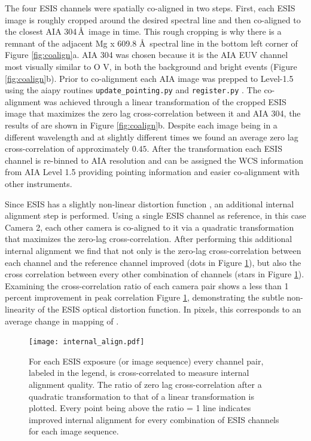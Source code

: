    		The four ESIS channels were spatially co-aligned in two steps.  
   		First, each ESIS image is roughly cropped around the desired spectral line and then co-aligned to the closest AIA 304\,\AA\ image in time.
   		This rough cropping is why there is a remnant of the adjacent Mg {\sc x} 609.8 \AA \ spectral line in the bottom left corner of Figure \ref{fig:coalign}a.
   		AIA 304 was chosen because it is the AIA EUV channel most visually similar to O V, in both the background and bright events (Figure \ref{fig:coalign}b).
   		Prior to co-alignment each AIA image was prepped to Level-1.5 using the aiapy routines \texttt{update\_pointing.py} and \texttt{register.py} \citep{aiapy}.
   		The co-alignment was achieved through a linear transformation of the cropped ESIS image that maximizes the zero lag cross-correlation between it and AIA 304, the results of are shown in Figure \ref{fig:coalign}b.
   		Despite each image being in a different wavelength and at slightly different times we found an average zero lag cross-correlation of approximately $0.45$.
   		After the transformation each ESIS channel is re-binned to AIA resolution and can be assigned the WCS information from AIA Level 1.5 providing pointing information and easier co-alignment with other instruments.

    	Since ESIS has a slightly non-linear distortion function \citep{ESIS}, an additional internal alignment step is performed.
    	Using a single ESIS channel as reference, in this case Camera 2, each other camera is co-aligned to it via a quadratic transformation that maximizes the zero-lag cross-correlation. 
    	After performing this additional internal alignment we find that not only is the zero-lag cross-correlation between each channel and the reference channel improved (dots in Figure \ref{fig:cc}), but also the cross correlation between every other combination of channels (stars in Figure \ref{fig:cc}).
    	Examining the cross-correlation ratio of each camera pair shows a less than 1 percent improvement in peak correlation Figure \ref{fig:cc}, demonstrating the subtle non-linearity of the ESIS optical distortion function.
    	In pixels, this corresponds to an average change in mapping of .
    	
    	\begin{figure}[htb!]
    		\centering
    		\texttt{[image: internal\_align.pdf]}
    		\caption{For each ESIS exposure (or image sequence) every channel pair, labeled in the legend, is cross-correlated to measure internal alignment quality.  The ratio of zero lag cross-correlation after a quadratic transformation to that of a linear transformation is plotted.  Every point being above the ratio = 1 line indicates improved internal alignment for every combination of ESIS channels for each image sequence.}
    		\label{fig:cc}	
    	\end{figure}
    	
